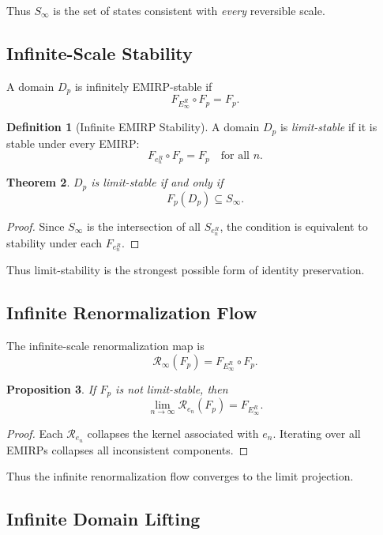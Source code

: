 \documentclass[11pt]{article}
\theoremstyle{definition}
\newtheorem{definition}{Definition}[section]
\theoremstyle{plain}
\newtheorem{theorem}[definition]{Theorem}
\newtheorem{proposition}[definition]{Proposition}
\theoremstyle{remark}
\begin{document}
Thus $S_\infty$ is the set of states consistent with \emph{every}
reversible scale.

\subsection{Infinite-Scale Stability}

A domain $D_p$ is infinitely EMIRP-stable if
\[
F_{E_\infty^R} \circ F_p = F_p.
\]

\begin{definition}[Infinite EMIRP Stability]
A domain $D_p$ is \emph{limit-stable} if it is stable under every EMIRP:
\[
F_{e_n^R} \circ F_p = F_p
\quad \text{for all } n.
\]
\end{definition}

\begin{theorem}
$D_p$ is limit-stable if and only if
\[
F_p(D_p) \subseteq S_\infty.
\]
\end{theorem}

\begin{proof}
Since $S_\infty$ is the intersection of all $S_{e_n^R}$, the condition
is equivalent to stability under each $F_{e_n^R}$.
\end{proof}

Thus limit-stability is the strongest possible form of identity
preservation.

\subsection{Infinite Renormalization Flow}

The infinite-scale renormalization map is
\[
\mathcal{R}_\infty(F_p) = F_{E_\infty^R} \circ F_p.
\]

\begin{proposition}
If $F_p$ is not limit-stable, then
\[
\lim_{n \to \infty} \mathcal{R}_{e_n}(F_p) = F_{E_\infty^R}.
\]
\end{proposition}

\begin{proof}
Each $\mathcal{R}_{e_n}$ collapses the kernel associated with $e_n$.
Iterating over all EMIRPs collapses all inconsistent components.
\end{proof}

Thus the infinite renormalization flow converges to the limit projection.

\subsection{Infinite Domain Lifting}
\end{document}
